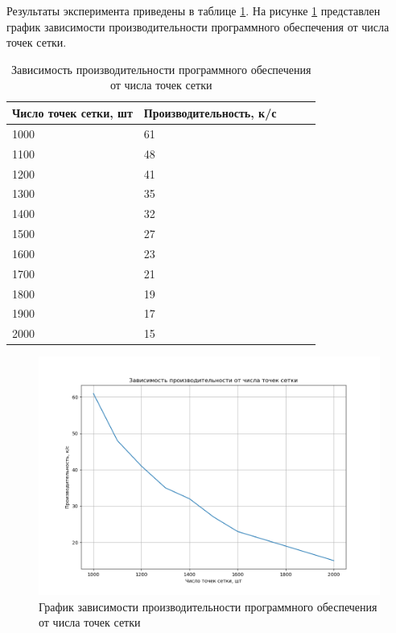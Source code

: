 Результаты эксперимента приведены в таблице \ref{tab:test}. На рисунке \ref{img:test} представлен график зависимости производительности программного обеспечения от числа точек сетки.

\begin{table}[h]
    \caption{Зависимость производительности программного обеспечения от числа точек сетки}
    \begin{center}
        \begin{tabular}{|l|l|l|l|l|}
            \hline
            Число точек сетки, шт & Производительность, к/с \\ \hline
            1000 & 61 \\ \hline
            1100 & 48 \\ \hline
            1200 & 41 \\ \hline
            1300 & 35 \\ \hline
            1400 & 32 \\ \hline
            1500 & 27 \\ \hline
            1600 & 23 \\ \hline
            1700 & 21 \\ \hline
            1800 & 19 \\ \hline
            1900 & 17 \\ \hline
            2000 & 15 \\ \hline
        \end{tabular}
    \end{center}
    \label{tab:test}
\end{table}

\begin{figure}[H]
	\begin{center}
		\includegraphics[scale=0.6]{img/test.png}
	\end{center}
	\captionsetup{justification=centering}
	\caption{График зависимости производительности программного обеспечения от числа точек сетки}
	\label{img:test}
\end{figure}

